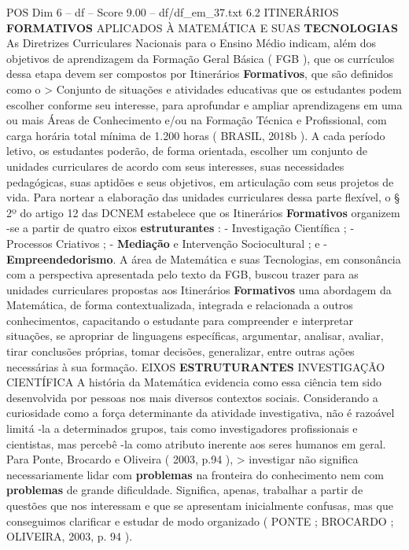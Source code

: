 \begin{textsample}{POS Dim 6 – df – Score 9.00 – df/df\_em\_37.txt}  \label{ex:f6_pos_126}
6.2 ITINERÁRIOS \textbf{FORMATIVOS} APLICADOS À MATEMÁTICA E SUAS \textbf{TECNOLOGIAS} As Diretrizes Curriculares Nacionais para o Ensino Médio indicam, além dos objetivos de aprendizagem da Formação Geral Básica ( FGB ), que os currículos dessa etapa devem ser compostos por Itinerários \textbf{Formativos}, que são definidos como o > Conjunto de situações e atividades educativas que os estudantes podem escolher conforme seu interesse, para aprofundar e ampliar aprendizagens em uma ou mais Áreas de Conhecimento e/ou na Formação Técnica e Profissional, com carga horária total mínima de 1.200 horas ( BRASIL, 2018b ).
A cada período letivo, os estudantes poderão, de forma orientada, escolher um conjunto de unidades curriculares de acordo com seus interesses, suas necessidades pedagógicas, suas aptidões e seus objetivos, em articulação com seus projetos de vida.
Para nortear a elaboração das unidades curriculares dessa parte flexível, o § 2º do artigo 12 das DCNEM estabelece que os Itinerários \textbf{Formativos} organizem -se a partir de quatro eixos \textbf{estruturantes} : - Investigação Científica ; - Processos Criativos ; - \textbf{Mediação} e Intervenção Sociocultural ; e - \textbf{Empreendedorismo}.
A área de Matemática e suas Tecnologias, em consonância com a perspectiva apresentada pelo texto da FGB, buscou trazer para as unidades curriculares propostas aos Itinerários \textbf{Formativos} uma abordagem da Matemática, de forma contextualizada, integrada e relacionada a outros conhecimentos, capacitando o estudante para compreender e interpretar situações, se apropriar de linguagens específicas, argumentar, analisar, avaliar, tirar conclusões próprias, tomar decisões, generalizar, entre outras ações necessárias à sua formação.
EIXOS \textbf{ESTRUTURANTES} INVESTIGAÇÃO CIENTÍFICA A história da Matemática evidencia como essa ciência tem sido desenvolvida por pessoas nos mais diversos contextos sociais.
Considerando a curiosidade como a força determinante da atividade investigativa, não é razoável limitá -la a determinados grupos, tais como investigadores profissionais e cientistas, mas percebê -la como atributo inerente aos seres humanos em geral.
Para Ponte, Brocardo e Oliveira ( 2003, p.94 ), > investigar não significa necessariamente lidar com \textbf{problemas} na fronteira do conhecimento nem com \textbf{problemas} de grande dificuldade.
Significa, apenas, trabalhar a partir de questões que nos interessam e que se apresentam inicialmente confusas, mas que conseguimos clarificar e estudar de modo organizado ( PONTE ; BROCARDO ; OLIVEIRA, 2003, p. 94 ).

\end{textsample}
